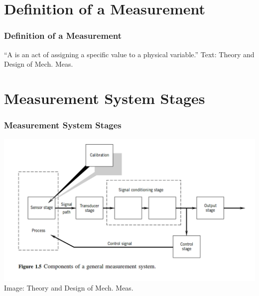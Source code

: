 \documentclass[fleqn]{beamer} %
\newcommand{\sectiontitleII}{Definition of a Measurement}
\newcommand{\sectiontitleIII}{Measurement System Stages}
\begin{document}
\section{\sectiontitleII}

\begin{frame}[label=sectionII]
\frametitle{\sectiontitleII}

\large{``A \hspcuu is an act of assigning a specific value to a physical variable.''} \vspc
{\tiny Text: Theory and Design of Mech. Meas.}

\end{frame}

\section{\sectiontitleIII}

\begin{frame}[label=sectionIII]
\frametitle{\sectiontitleIII}

\includegraphics[scale=.3]{measurement_stages} \\
{\tiny Image: Theory and Design of Mech. Meas.}
\end{frame}
\end{document}
